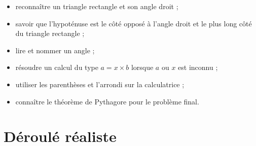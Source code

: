 \documentclass[12pt,a4paper]{article}
\begin{document}
\begin{itemize}
  \item reconnaître un triangle rectangle et son angle droit ;
  \item savoir que l'hypoténuse est le côté opposé à l'angle droit
        et le plus long côté du triangle rectangle ;
  \item lire et nommer un angle ;
  \item résoudre un calcul du type \(a=x\times b\) lorsque \(a\) ou \(x\) est inconnu ;
  \item utiliser les parenthèses et l'arrondi sur la calculatrice ;
  \item connaître le théorème de Pythagore pour le problème final.
\end{itemize}

\section*{Déroulé réaliste}
\end{document}
